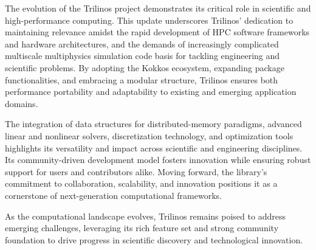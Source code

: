 
The evolution of the Trilinos project demonstrates its critical role in scientific and high-performance computing.
This update underscores Trilinos' dedication to maintaining relevance amidst the rapid development of HPC software frameworks and hardware architectures, and the demands of increasingly complicated multiscale multiphysics simulation code basis for tackling engineering and scientific problems.
By adopting the Kokkos ecosystem, expanding package functionalities, and embracing a modular structure,
Trilinos ensures both performance portability and adaptability to existing and emerging application domains.

The integration of data structures for distributed-memory paradigms, advanced linear and nonlinear solvers, discretization technology, and optimization tools highlights its versatility and impact across scientific and engineering disciplines.
Its community-driven development model fosters innovation while ensuring robust support for users and contributors alike.
Moving forward, the library's commitment to collaboration, scalability, and innovation positions it as a cornerstone of next-generation computational frameworks.

As the computational landscape evolves, Trilinos remains poised to address emerging challenges, leveraging its rich feature set and strong community foundation to drive progress in scientific discovery and technological innovation.